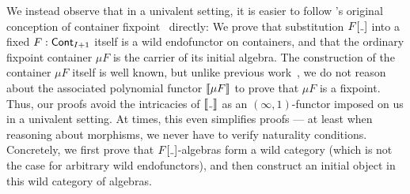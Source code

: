 We instead observe that in a univalent setting, it is easier to follow \citeauthor{Abbott2003CategoriesContainers}'s original conception of container fixpoint~\cite[Definition~5.1.6]{Abbott2003CategoriesContainers} directly:
We prove that substitution \( \Subst{F}{\Blank} \) into a fixed \( F : \operatorname{\mathsf{Cont}}_{I+1} \) itself is a wild endofunctor on containers,
and that the ordinary fixpoint container \( \mu F \) is the carrier of its initial algebra.
The construction of the container \( \mu F \) itself is well known,
but unlike previous work~\cite{Abbott2003CategoriesContainers,AbbottEtAl2005ContainersConstructingstrictly,AltenkirchEtAl2015Indexedcontainers,DamatoEtAl2025FormalisingInductiveCoinductive},
we do not reason about the associated polynomial functor \( \llbracket\mu F\rrbracket \) to prove that \( \mu F \) is a fixpoint.
Thus, our proofs avoid the intricacies of \( \Ext{\Blank} \) as an \( (\infty, 1) \)-functor imposed on us in a univalent setting.
At times, this even simplifies proofs --- at least when reasoning about morphisms, we never have to verify naturality conditions.
Concretely, we first prove that \( \Subst{F}{\Blank} \)-algebras form a wild category
(which is not the case for arbitrary wild endofunctors),
and then construct an initial object in this wild category of algebras.

